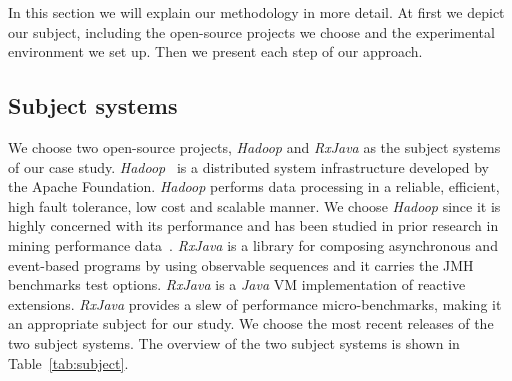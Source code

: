 In this section we will explain our methodology in more detail. At first we depict our subject, including the open-source projects we choose and the experimental environment we set up. Then we present each step of our approach.

\subsection{Subject systems}

We choose two open-source projects, \emph{Hadoop} and \emph{RxJava} as the subject systems of our case study. \emph{Hadoop}~\cite{hadoop2012:White} is a distributed system infrastructure developed by the Apache Foundation. \emph{Hadoop} performs data processing in a reliable, efficient, high fault tolerance, low cost and scalable manner. We choose \emph{Hadoop} since it is highly concerned with its performance and has been studied in prior research in mining performance data~\cite{markASE}. \emph{RxJava} is a library for composing asynchronous and event-based programs by using observable sequences and it carries the JMH benchmarks test options. \emph{RxJava} is a \emph{Java} VM implementation of reactive extensions. \emph{RxJava} provides a slew of performance micro-benchmarks, making it an appropriate subject for our study. We choose the most recent releases of the two subject systems. The overview of the two subject systems is shown in Table~\ref{tab:subject}. 
